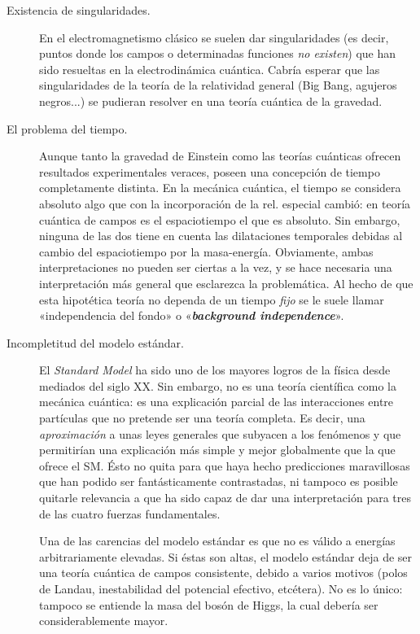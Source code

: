 \documentclass[11pt,a4paper,titlepage]{article}
\begin{document}
\begin{description}
  \item[Existencia de singularidades.]{En el electromagnetismo clásico se suelen dar singularidades (es decir, puntos donde los campos o determinadas funciones \textit{no existen}) que han sido resueltas en la electrodinámica cuántica. Cabría esperar que las singularidades de la teoría de la relatividad general (Big Bang, agujeros negros...) se pudieran resolver en una teoría cuántica de la gravedad.}

  \item[El problema del tiempo.]{Aunque tanto la gravedad de Einstein como las teorías cuánticas ofrecen resultados experimentales veraces, poseen una concepción de tiempo completamente distinta. En la mecánica cuántica, el tiempo se considera absoluto algo que con la incorporación de la rel. especial cambió: en teoría cuántica de campos es el espaciotiempo el que es absoluto. Sin embargo, ninguna de las dos tiene en cuenta las dilataciones temporales debidas al cambio del espaciotiempo por la masa-energía. Obviamente, ambas interpretaciones no pueden ser ciertas a la vez, y se hace necesaria una interpretación más general que esclarezca la problemática. Al hecho de que esta hipotética teoría no dependa de un tiempo \textit{fijo} se le suele llamar «independencia del fondo» o «\textbf{\textit{background independence}}».}

  \item[Incompletitud del modelo estándar.]{El \textit{Standard Model} ha sido uno de los mayores logros de la física desde mediados del siglo XX. Sin embargo, no es una teoría científica como la mecánica cuántica: es una explicación parcial de las interacciones entre partículas que no pretende ser una teoría completa. Es decir, una \textit{aproximación} a unas leyes generales que subyacen a los fenómenos y que permitirían una explicación más simple y mejor globalmente que la que ofrece el SM. Ésto no quita para que haya hecho predicciones maravillosas que han podido ser fantásticamente contrastadas, ni tampoco es posible quitarle relevancia a que ha sido capaz de dar una interpretación para tres de las cuatro fuerzas fundamentales.

  Una de las carencias del modelo estándar es que no es válido a energías arbitrariamente elevadas. Si éstas son altas, el modelo estándar deja de ser una teoría cuántica de campos consistente, debido a varios motivos (polos de Landau, inestabilidad del potencial efectivo, etcétera). No es lo único: tampoco se entiende la masa del bosón de Higgs, la cual debería ser considerablemente mayor.

}
\end{description}
\end{document}
